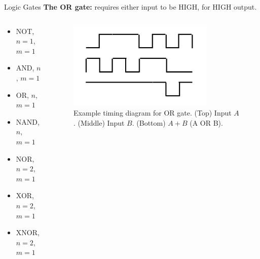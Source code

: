 \documentclass{beamer}
\begin{document}
\begin{frame}{Logic Gates}
\textbf{The OR gate:} requires either input to be HIGH, for HIGH output. \\ \vspace{0.5cm}
\begin{columns}[T]
\begin{column}{0.5\textwidth}
\begin{itemize}
\item \alert{NOT, $n=1$, $m=1$}
\item \alert{AND, $n$, $m=1$}
\item \alert{OR, $n$, $m=1$}
\item NAND, $n$, $m=1$
\item NOR, $n=2$, $m=1$
\item XOR, $n=2$, $m=1$
\item XNOR, $n=2$, $m=1$
\end{itemize}
\end{column}
\begin{column}{0.5\textwidth}
\begin{figure}
\centering
\includegraphics[width=0.8\textwidth]{figures/TimingOr.pdf}
\caption{\label{fig:or2} Example timing diagram for OR gate.  (Top) Input $A$.  (Middle) Input $B$. (Bottom) $A+B$ (A OR B).}
\end{figure}
\end{column}
\end{columns}
\end{frame}
\end{document}
